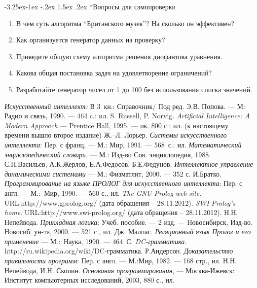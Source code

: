 \documentclass[12pt, openany, oneside]{book} %
\makeatletter
\renewcommand\subsubsection{\@startsection{subsubsection}{3}{\z@}%
                                     {-3.25ex\@plus -1ex \@minus -.2ex}%
                                     {1.5ex \@plus .2ex}%
                                     {\normalfont\normalsize\bfseries}}
\newenvironment{questions}{\subsubsection*{Вопросы для самопроверки}\begin{enumerate}}{\end{enumerate}}
\makeatother
\begin{document}
\begin{questions}
\item{} В чем суть алгоритма ``Британского музея''? На сколько он эффективен?
\item{} Как организуется генератор данных на проверку?
\item{} Приведите общую схему алгоритма решения диофантова уравнения.
\item{} Какова общая постановка задач на удовлетворение ограничений?
\item{} Разработайте генератор чисел от 1 до 100 без использования списка значений.
\end{questions}



\begin{thebibliography}{99}
 \emph{Искусственный интеллект:} В 3~кн.:
Справочник/ Под ред. Э.В. Попова. --- М: Радио и связь, 1990. --- 464 c.: ил.
 S. Russell, P. Norvig. \emph{Artificial Intelligence: A Modern Approach} --- Prentice Hall, 1995. --- ок. 800 с.: ил. (к настоящему времени вышло второе издание)
 Ж.--Л. Лорьер. \emph{Системы искусственного
интеллекта}: Пер. с франц. --- М.: Мир, 1991. --- 568~с.: ил.
 \emph{Математический энциклопедический словарь.} ---
М.: Изд-во Сов. энциклопедия, 1988.
 С.Н.Васильев, А.К.Жерлов, Е.А.Федосов, Б.Е.Федунов.
\emph{Интеллектное управление динамическими системами} --- М.:
Физматлит, 2000. --- 352 с.
 И.Братко. \emph{Программирование на языке ПРОЛОГ для
искусственного интеллекта}: Пер. с англ. --- М.:~Мир, 1990. --- 560 с., ил.
 \emph{The GNU Prolog web site}. URL:http://www.gprolog.org/ (дата обращения -- 28.11.2012).
 \emph{SWI-Prolog's home}. URL:http://www.swi-prolog.org/ (дата обращения -- 28.11.2012).
 Н.Н. Непейвода. \emph{Прикладная логика}: Учеб. пособие.
--- 2 изд. --- Новосибирск, Изд-во. Новосиб. ун-та, 2000. --- 521 с., ил.
 Дж. Малпас. \emph{Реляционный язык Пролог и его применение} ---
М.:~Наука, 1990. --- 464~С.
 \emph{DC-грамматика.} http://ru.wikipedia.org/wiki/DC-грамматика.
 Р.Андерсон. \emph{Доказательство правильности программ}:
Пер. с англ. --- М.:Мир, 1982. --- 168 стр., ил.
Н.Н. Непейвода, И.Н. Скопин. \emph{Основания программирования}, — Москва-Ижевск: Институт компьютерных исследований, 2003, 880 с., ил.
\end{thebibliography}
\label{pg:lastpage}
\end{document}
